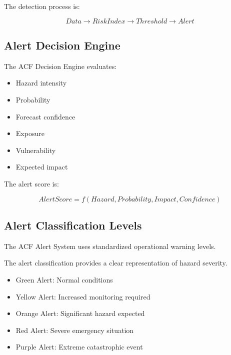 The detection process is:

\[
Data
\rightarrow
RiskIndex
\rightarrow
Threshold
\rightarrow
Alert
\]



\subsection{Alert Decision Engine}

The ACF Decision Engine evaluates:

\begin{itemize}

\item Hazard intensity

\item Probability

\item Forecast confidence

\item Exposure

\item Vulnerability

\item Expected impact

\end{itemize}


The alert score is:

\[
AlertScore=
f(Hazard,Probability,Impact,Confidence)
\]


\subsection{Alert Classification Levels}

The ACF Alert System uses standardized operational warning levels.

The alert classification provides a clear representation of hazard
severity.


\begin{itemize}

\item Green Alert: Normal conditions

\item Yellow Alert: Increased monitoring required

\item Orange Alert: Significant hazard expected

\item Red Alert: Severe emergency situation

\item Purple Alert: Extreme catastrophic event

\end{itemize}


